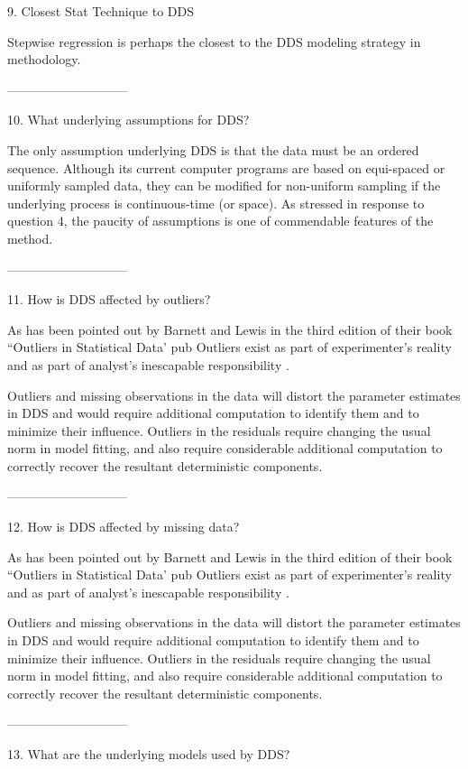 9. Closest Stat Technique to DDS
 
Stepwise regression is perhaps the closest to the
DDS modeling strategy in methodology.
 
-----------------------------
 
10. What underlying assumptions for DDS?
 
The only assumption underlying DDS is that the
data must be an ordered sequence.  Although its
current computer programs are based on equi-spaced
or uniformly sampled data, they can be modified
for non-uniform sampling if the underlying process
is continuous-time (or space).  As stressed in
response to question 4, the paucity of assumptions
is one of commendable features of the method.
 
-----------------------------
 
11. How is DDS affected by outliers?
 
As has been pointed out by Barnett and Lewis in
the third edition of their book ``Outliers in
Statistical Data' pub Outliers exist as part of
experimenter's reality and as part of analyst's
inescapable responsibility .
 
Outliers and missing observations in the data will
distort the parameter estimates in DDS and would
require additional computation to identify them
and to minimize their influence.  Outliers in the
residuals require changing the usual norm in model
fitting, and also require considerable additional
computation to correctly recover the resultant
deterministic components.
 
-----------------------------
 
12. How is DDS affected by missing data?
 
As has been pointed out by Barnett and Lewis in
the third edition of their book ``Outliers in
Statistical Data' pub Outliers exist as part of
experimenter's reality and as part of analyst's
inescapable responsibility .
 
Outliers and missing observations in the data will
distort the parameter estimates in DDS and would
require additional computation to identify them
and to minimize their influence.  Outliers in the
residuals require changing the usual norm in model
fitting, and also require considerable additional
computation to correctly recover the resultant
deterministic components.
 
-----------------------------
 
13. What are the underlying models used by DDS?
 
